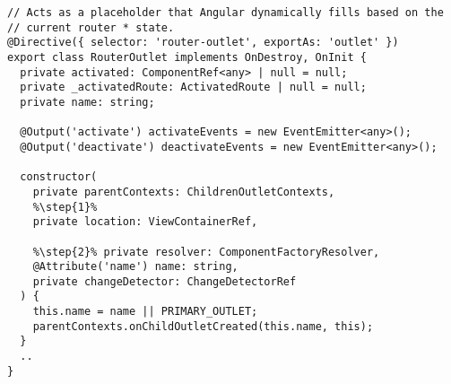 \begin{verbatim}
// Acts as a placeholder that Angular dynamically fills based on the
// current router * state.
@Directive({ selector: 'router-outlet', exportAs: 'outlet' })
export class RouterOutlet implements OnDestroy, OnInit {
  private activated: ComponentRef<any> | null = null;
  private _activatedRoute: ActivatedRoute | null = null;
  private name: string;

  @Output('activate') activateEvents = new EventEmitter<any>();
  @Output('deactivate') deactivateEvents = new EventEmitter<any>();

  constructor(
    private parentContexts: ChildrenOutletContexts,
    %\step{1}%
    private location: ViewContainerRef,

    %\step{2}% private resolver: ComponentFactoryResolver,
    @Attribute('name') name: string,
    private changeDetector: ChangeDetectorRef
  ) {
    this.name = name || PRIMARY_OUTLET;
    parentContexts.onChildOutletCreated(this.name, this);
  }
  ..
}
\end{verbatim}
